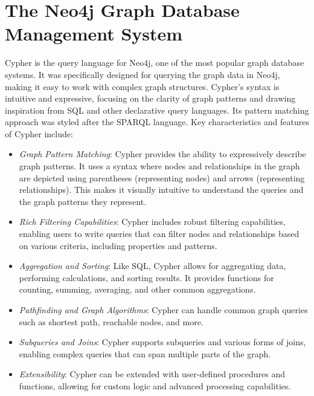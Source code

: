 \section{The Neo4j Graph Database Management System}

Cypher is the query language for Neo4j, one of the most popular graph database systems. It was specifically designed for querying the graph data in Neo4j, making it easy to work with complex graph structures. Cypher's syntax is intuitive and expressive, focusing on the clarity of graph patterns and drawing inspiration from SQL and other declarative query languages. Its pattern matching approach was styled after the SPARQL language. Key characteristics and features of Cypher include:

\begin{itemize}
\item \emph{Graph Pattern Matching}: Cypher provides the ability to expressively describe graph patterns. It uses a syntax where nodes and relationships in the graph are depicted using parentheses (representing nodes) and arrows (representing relationships). This makes it visually intuitive to understand the queries and the graph patterns they represent.

\item \emph{Rich Filtering Capabilities}: Cypher includes robust filtering capabilities, enabling users to write queries that can filter nodes and relationships based on various criteria, including properties and patterns.

\item \emph{Aggregation and Sorting}: Like SQL, Cypher allows for aggregating data, performing calculations, and sorting results. It provides functions for counting, summing, averaging, and other common aggregations.

\item \emph{Pathfinding and Graph Algorithms}: Cypher can handle common graph queries such as shortest path, reachable nodes, and more.

\item \emph{Subqueries and Joins}: Cypher supports subqueries and various forms of joins, enabling complex queries that can span multiple parts of the graph.

\item \emph{Extensibility}: Cypher can be extended with user-defined procedures and functions, allowing for custom logic and advanced processing capabilities.
\end{itemize}

